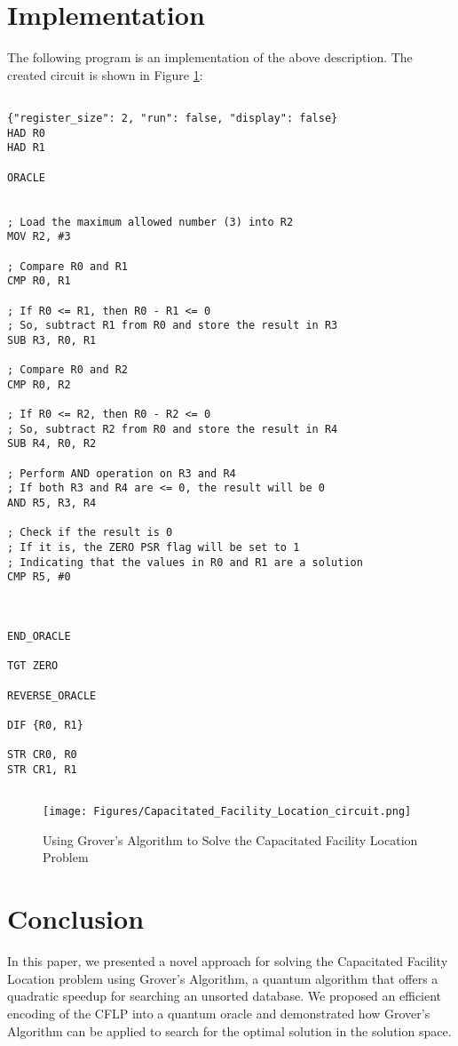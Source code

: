 \section{Implementation}

The following program is an implementation of the above description. The created circuit is shown in Figure \ref{fig:Capacitated_Facility_Location}:

\begin{lstlisting}

{"register_size": 2, "run": false, "display": false}
HAD R0
HAD R1

ORACLE


; Load the maximum allowed number (3) into R2
MOV R2, #3

; Compare R0 and R1
CMP R0, R1

; If R0 <= R1, then R0 - R1 <= 0
; So, subtract R1 from R0 and store the result in R3
SUB R3, R0, R1

; Compare R0 and R2
CMP R0, R2

; If R0 <= R2, then R0 - R2 <= 0
; So, subtract R2 from R0 and store the result in R4
SUB R4, R0, R2

; Perform AND operation on R3 and R4
; If both R3 and R4 are <= 0, the result will be 0
AND R5, R3, R4

; Check if the result is 0
; If it is, the ZERO PSR flag will be set to 1
; Indicating that the values in R0 and R1 are a solution
CMP R5, #0



END_ORACLE

TGT ZERO

REVERSE_ORACLE

DIF {R0, R1}

STR CR0, R0
STR CR1, R1


\end{lstlisting}

\begin{figure}[htp]
    \centering
    \texttt{[image: Figures/Capacitated\_Facility\_Location\_circuit.png]}
    \caption{Using Grover's Algorithm to Solve the Capacitated Facility Location Problem}
    \label{fig:Capacitated_Facility_Location}
\end{figure}

\section{Conclusion}\label{sec:conclusion}

In this paper, we presented a novel approach for solving the Capacitated Facility Location problem using Grover's Algorithm, a quantum algorithm that offers a quadratic speedup for searching an unsorted database. We proposed an efficient encoding of the CFLP into a quantum oracle and demonstrated how Grover's Algorithm can be applied to search for the optimal solution in the solution space.

